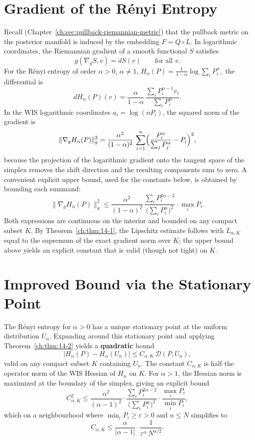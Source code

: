 \section{Gradient of the R\'enyi Entropy}\label{ch:sec:gradient-of-the-renyi-entropy}
Recall (Chapter~\ref{ch:sec:pullback-riemannian-metric}) that the pullback metric on the posterior manifold is induced by
the embedding \(F=Q\circ L\). In logarithmic coordinates, the Riemannian
gradient of a smooth functional \(S\) satisfies
\[
g(\nabla_g S, v) = dS(v) \qquad\text{for all }v.
\]
For the R\'enyi entropy of order \(\alpha>0\), \(\alpha\neq1\),
$H_\alpha(P)=\frac1{1-\alpha}\log\sum_i P_i^{\alpha},$
the differential is
\[
dH_\alpha(P)(v)
=
\frac{\alpha}{1-\alpha}
\,
\frac{\sum_i P_i^{\alpha-1}v_i}{\sum_i P_i^{\alpha}}.
\]
In the WIS logarithmic coordinates \(a_i=\log(nP_i)\), the squared norm
of the gradient is
\[
\|\nabla_g H_\alpha(P)\|_g^2
=
\frac{\alpha^2}{(1-\alpha)^2}
\,
\sum_{i=1}^n
\Bigl(
\frac{P_i^{\alpha}}{\sum_j P_j^{\alpha}}
-
P_i
\Bigr)^2,
\]
because the projection of the logarithmic gradient onto the tangent
space of the simplex removes the shift direction and the resulting
components sum to zero.  A convenient explicit upper bound, used for
the constants below, is obtained by bounding each summand:
\[
\|\nabla_g H_\alpha(P)\|_g^2
\le
\frac{\alpha^2}{(1-\alpha)^2}
\,
\frac{
\sum_i P_i^{2\alpha-2}
}{
\bigl(\sum_i P_i^{\alpha}\bigr)^2
}
\cdot
\max_i P_i.
\]
Both expressions are continuous on the interior and bounded on any
compact subset \(K\). By Theorem~\ref{ch:thm:14-1}, the Lipschitz estimate
follows with \(L_{\alpha,K}\) equal to the supremum of the exact
gradient norm over \(K\); the upper bound above yields an explicit
constant that is valid (though not tight) on \(K\).
\section{Improved Bound via the Stationary Point}\label{ch:sec:improved-bound-via-the-stationary-point}
The R\'enyi entropy for \(\alpha>0\) has a unique stationary point at the
uniform distribution \(U_n\). Expanding around this stationary point and
applying Theorem~\ref{ch:thm:14-2} yields a \textbf{quadratic} bound
\[
|H_\alpha(P)-H_\alpha(U_n)|
\le
C_{\alpha,K}\,\mathcal D(P,U_n),
\]
valid on any compact subset \(K\) containing \(U_n\). The constant
\(C_{\alpha,K}\) is half the operator norm of the WIS Hessian of
\(H_\alpha\) on \(K\).
For \(\alpha>1\), the Hessian norm is maximized at the boundary of the
simplex, giving an explicit bound
\[
C_{\alpha,K}^2
\le
\frac{\alpha^2}{(\alpha-1)^2}
\cdot
\frac{
\sum_i P_i^{2\alpha-2}
}{
\bigl(\sum_i P_i^{\alpha}\bigr)^2
}
\cdot
\frac{\max_i P_i}{\min_i P_i},
\]
which on a neighbourhood where \(\min_i P_i\ge\varepsilon>0\) and
\(n\le N\) simplifies to
\[
C_{\alpha,K}
\le
\frac{\alpha}{|\alpha-1|}
\cdot
\frac{1}{\varepsilon^{\alpha}\,N^{\alpha/2}}.
\]
